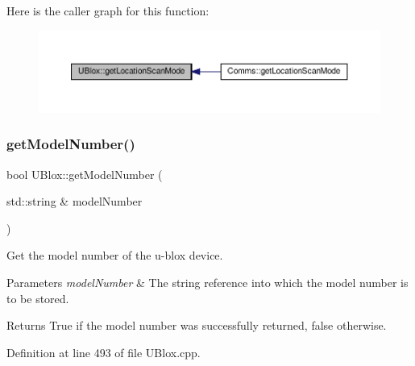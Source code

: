 Here is the caller graph for this function\+:\nopagebreak
\begin{figure}[H]
\begin{center}
\leavevmode
\includegraphics[width=350pt]{da/df6/class_u_blox_a398db4cdc2d5356fb86b3cd1021bad1b_icgraph}
\end{center}
\end{figure}
\mbox{\label{class_u_blox_ab9b9a03e10360c931686c1fe04af078d}} 
\subsubsection{\texorpdfstring{get\+Model\+Number()}{getModelNumber()}}
{\footnotesize\ttfamily bool U\+Blox\+::get\+Model\+Number (\begin{DoxyParamCaption}\item[{std\+::string \&}]{model\+Number }\end{DoxyParamCaption})}

Get the model number of the u-\/blox device.


\begin{DoxyParams}{Parameters}
{\em model\+Number} & The string reference into which the model number is to be stored. \\
\hline
\end{DoxyParams}
\begin{DoxyReturn}{Returns}
True if the model number was successfully returned, false otherwise. 
\end{DoxyReturn}


Definition at line 493 of file U\+Blox.\+cpp.


